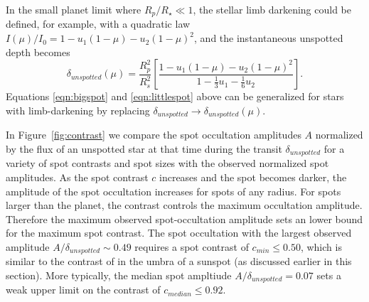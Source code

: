 \documentclass[iop]{emulateapj}
\begin{document}
In the small planet limit where $R_p/R_\star \ll 1$, the stellar limb darkening could be defined, for example, with a quadratic law $I(\mu)/I_0 = 1 - u_1(1-\mu) - u_2(1-\mu)^2$, and the instantaneous unspotted depth becomes 
\begin{equation}
\delta_{unspotted}(\mu) =  \frac{R_p^2}{R_s^2} \left[ \frac{1 - u_1(1-\mu) - u_2(1-\mu)^2}{1 - \frac{1}{3}u_1 - \frac{1}{6}u_2} \right].
\end{equation}
Equations \ref{eqn:bigspot} and \ref{eqn:littlespot} above can be generalized for stars with limb-darkening by replacing $\delta_{unspotted} \rightarrow \delta_{unspotted}(\mu)$.

In Figure~\ref{fig:contrast} we compare the spot occultation amplitudes $A$ normalized by the flux of an unspotted star at that time during the transit $\delta_{unspotted}$ for a variety of spot contrasts and spot sizes with the observed normalized spot amplitudes. As the spot contrast $c$ increases and the spot becomes darker, the amplitude of the spot occultation increases for spots of any radius. For spots larger than the planet, the contrast controls the maximum occultation amplitude. Therefore the maximum observed spot-occultation amplitude sets an lower bound for the maximum spot contrast. The spot occultation with the largest observed amplitude $A/\delta_{unspotted} \sim 0.49$ requires a spot contrast of $c_{min} \le 0.50$, which is similar to the contrast of in the umbra of a sunspot (as discussed earlier in this section). More typically, the median spot ampltiude $A/\delta_{unspotted} = 0.07$ sets a weak upper limit on the contrast of $c_{median} \le 0.92$. 





\end{document}
